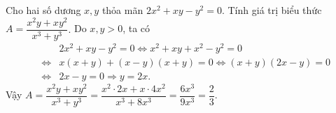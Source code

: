 \begin{bt}%
	Cho hai số dương $x, y$ thỏa mãn $2x^2+xy-y^2=0$. Tính giá trị biểu thức $A=\dfrac{x^2y+xy^2}{x^3+y^3}$.
	\loigiai
	{Do $x, y>0$, ta có 
	{\allowdisplaybreaks
\begin{eqnarray*}
& & 2x^2+xy-y^2=0 \Leftrightarrow x^2+xy +x^2-y^2=0\\
&\Leftrightarrow& x(x+y) +(x-y)(x+y)=0 \Leftrightarrow (x+y)(2x-y)=0\\
&\Leftrightarrow& 2x-y=0 \Rightarrow y=2x.
\end{eqnarray*}
}
Vậy $A=\dfrac{x^2y+xy^2}{x^3+y^3}=\dfrac{x^2\cdot 2x +x\cdot 4x^2}{x^3 +8x^3}=\dfrac{6x^3}{9x^3}=\dfrac{2}{3}$.
	}
\end{bt}

